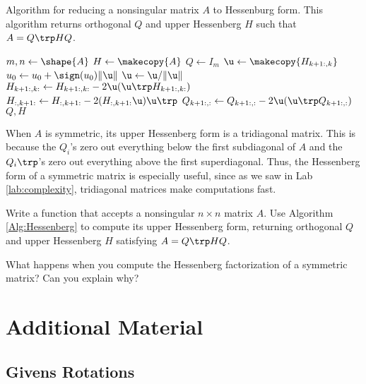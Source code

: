 \begin{algorithm}
\caption{Algorithm for reducing a nonsingular matrix $A$ to Hessenburg form.
This algorithm returns orthogonal $Q$ and upper Hessenberg $H$ such that $A = Q\trp HQ$.}
\label{Alg:Hessenberg}
\begin{algorithmic}[1]
    \State $m, n \gets \shape{A}$
    \State $H \gets \makecopy{A}$
    \State $Q \gets I_{m}$
        \State $\u \gets \makecopy{H_{k+1:,k}}$
        \State $u_0 \gets u_0 + \sign(u_0)\|\u\|$
        \State $\u \gets \u/\|\u\|$
        \State $H_{k+1:,k:} \gets H_{k+1:,k:} - 2\u(\u\trp H_{k+1:,k:})$
        \State $H_{:,k+1:} \gets H_{:,k+1:} - 2(H_{:,k+1:} \u) \u\trp$
        \State $Q_{k+1:,:} \gets Q_{k+1:,:} - 2\u(\u\trp Q_{k+1:,:})$
    \EndFor
    \State {} $Q, H$
\EndProcedure
\end{algorithmic}
\end{algorithm}

When $A$ is symmetric, its upper Hessenberg form is a tridiagonal matrix.
This is because the $Q_i$'s zero out everything below the first subdiagonal of $A$ and the $Q_i\trp$'s zero out everything above the first superdiagonal.
Thus, the Hessenberg form of a symmetric matrix is especially useful, since as we saw in Lab \ref{lab:complexity}, tridiagonal matrices make computations fast.

\begin{problem} %
Write a function that accepts a nonsingular $n \times n$ matrix $A$.
Use Algorithm \ref{Alg:Hessenberg} to compute its upper Hessenberg form, returning orthogonal $Q$ and upper Hessenberg $H$ satisfying $A = Q\trp HQ$.
\end{problem}

What happens when you compute the Hessenberg factorization of a symmetric matrix?
Can you explain why?

\newpage

\section*{Additional Material} %

\subsection*{Givens Rotations} %

